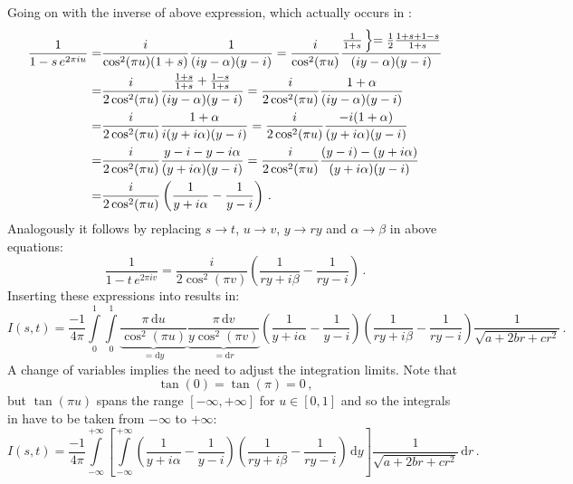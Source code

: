 Going on with the inverse of above expression, which actually occurs in :
\begin{align}
  \frac{1}{ 1 - s\, e^{2 \pi i u}}
  =&  \frac{i}{\cos^2(\pi u) (1+s)} \frac{1}{(i y - \alpha) (y-i)}
  =  \frac{i}{\cos^2(\pi u)} \frac{\frac{1}{1+s} \,\Bigl\}=\frac{1}{2}\frac{1+s+1-s}{1+s}}{(i y - \alpha) (y-i)} \nonumber \\
  =& \frac{i}{2 \cos^2(\pi u)} \frac{\frac{1+s}{1+s} + \frac{1-s}{1+s}}{(i y - \alpha) (y-i)}
  =  \frac{i}{2 \cos^2(\pi u)} \frac{1 + \alpha}{(i y - \alpha) (y-i)} \nonumber \\
  =& \frac{i}{2 \cos^2(\pi u)} \frac{1 + \alpha}{i (y + i \alpha) (y-i)}
  =  \frac{i}{2 \cos^2(\pi u)} \frac{-i (1 + \alpha)}{(y + i \alpha) (y-i)} \nonumber \\
  =& \frac{i}{2 \cos^2(\pi u)} \frac{y - i - y - i \alpha}{(y + i \alpha) (y-i)}
  =  \frac{i}{2 \cos^2(\pi u)} \frac{(y - i) - (y + i \alpha)}{(y + i \alpha) (y-i)} \nonumber \\
  =& \frac{i}{2 \cos^2(\pi u)} \left( \frac{1}{y + i \alpha} - \frac{1}{y-i} \right) \, .
\end{align}
Analogously it follows by replacing
$s \rightarrow t$,
$u \rightarrow v$,
$y \rightarrow ry$ and
$\alpha \rightarrow \beta$ in above equations:
\begin{equation}
    \frac{1}{ 1 - t\, e^{2 \pi i v}}
  = \frac{i}{2 \cos^2(\pi v)} \left( \frac{1}{ry + i \beta} - \frac{1}{ry-i} \right) \, .
\end{equation}
Inserting these expressions into  results in:
\begin{equation}
  I(s,t) = \frac{-1}{4 \pi}
  \int\limits_0^1 \int\limits_0^1
  \underbrace{\frac{\pi \,\mathrm{d}u}{  \cos^2(\pi u)}}_{= \mathrm{d}y}
  \underbrace{\frac{\pi \,\mathrm{d}v}{y \cos^2(\pi v)}}_{= \mathrm{d}r}
  \left( \frac{1}{y + i \alpha} - \frac{1}{y-i} \right)
  \left( \frac{1}{ry + i \beta} - \frac{1}{ry-i} \right)
  \frac{1}{\sqrt{ a + 2 b r + c r^2 }} \, . \label{eqn:int_I_to_transform}
\end{equation}
A change of variables implies the need to adjust the integration limits.
Note that
\begin{equation}
  \tan(0) = \tan(\pi) = 0 \, ,
\end{equation}
but $\tan(\pi u)$ spans the range $[-\infty,+\infty]$ for $u \in [0,1]$
and so the integrals in  have to be taken from $-\infty$ to $+\infty$:
\begin{equation}
  I(s,t) = \frac{-1}{4 \pi}
  \int\limits_{-\infty}^{+\infty}
    \left[
    \int\limits_{-\infty}^{+\infty}
      \left( \frac{1}{y + i \alpha} - \frac{1}{y-i} \right)
      \left( \frac{1}{ry + i \beta} - \frac{1}{ry-i} \right)
      \,\mathrm{d}y
    \right]
  \frac{1}{\sqrt{ a + 2 b r + c r^2 }}
  \,\mathrm{d}r
  \, . \label{eqn:int_I_transformed}
\end{equation}
